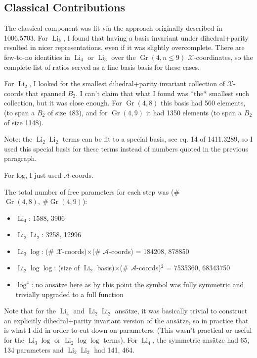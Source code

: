 \documentclass[11pt]{article}
\DeclareMathOperator{\Gr}{Gr}
\DeclareMathOperator{\Li}{Li}
\def\x{\mathcal{X}}
\def\a{\mathcal{A}}
\begin{document}
\subsection{Classical Contributions}

The classical component was fit via the approach originally described in 1006.5703. For $\Li_k$, I found that having a basis invariant under dihedral+parity resulted in nicer representations, even if it was slightly overcomplete. There are few-to-no identities in $\Li_4$ or $\Li_3$ over the $\Gr(4,n\le9)$ $\x$-coordinates, so the complete list of ratios served as a fine basis basis for these cases. 

	For $\Li_2$, I looked for the smallest dihedral+parity invariant collection of $\x$-coords that spanned $B_2$. I can't claim that what I found was *the* smallest such collection, but it was close enough. For $\Gr(4,8)$ this basis had 560 elements, (to span a $B_2$ of size 483), and for $\Gr(4,9)$ it had 1350 elements (to span a $B_2$ of size 1148). 

	Note: the $\Li_2\Li_2$ terms can be fit to a special basis, see eq. 14 of 1411.3289, so I used this special basis for these terms instead of numbers quoted in the previous paragraph. 

	For log, I just used $\a$-coords.\pagebreak 

	The total number of free parameters for each step was (\#$\Gr(4,8),~\#\Gr(4,9)$):
	\begin{itemize}
		\item $\Li_4$: 1588, 3906 
		\item $\Li_2\Li_2$: 3258, 12996 
		\item $\Li_3\log$: (\# $\x$-coords)$\times$(\# $\a$-coords) = 184208, 878850
		\item $\Li_2\log\log$: (size of $\Li_2$ basis)$\times$(\# $\a$-coords)$^2$ = 7535360, 68343750
		\item $\log^4$: no ansätze here as by this point the symbol was fully symmetric and trivially upgraded to a full function
	\end{itemize}

	Note that for the $\Li_4$ and $\Li_2\Li_2$ ansätze, it was basically trivial to construct an explicitly dihedral+parity invariant version of the ansätze, so in practice that is what I did in order to cut down on parameters. (This wasn't practical or useful for the $\Li_3\log$ or $\Li_2\log\log$ terms). For $\Li_4$, the symmetric ansätze had 65, 134 parameters and $\Li_2\Li_2$ had 141, 464. 
\end{document}
